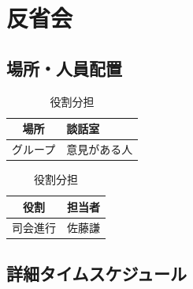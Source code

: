 \newpage

\section{反省会}  %

\subsection{場所・人員配置}
\begin{table}[h]
  \centering
  \begin{minipage}[t]{0.48\columnwidth}
    \centering
    \caption{場所・該当グループ}
    \begin{tabular}{cl}
      \hline
      場所 & 談話室 \\
      \hline
      グループ & 意見がある人 \\
      \hline
    \end{tabular}
  \end{minipage}
  \begin{minipage}[t]{0.48\columnwidth}
    \centering
    \caption{役割分担}
    \begin{tabular}{ll}
      \hline
      \multicolumn{1}{c}{役割} & \multicolumn{1}{c}{担当者} \\
      \hline
      司会進行 & 佐藤謙 \\
      \hline
    \end{tabular}
  \end{minipage}
\end{table}

\subsection{詳細タイムスケジュール}
\vspace{0.5em}
\fontsize{8pt}{12pt}\selectfont


